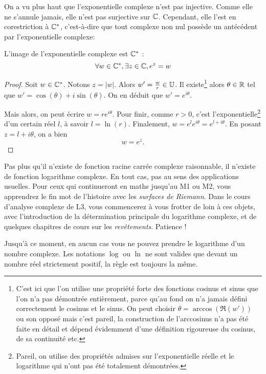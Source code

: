 On a vu plus haut que l'exponentielle complexe n'est pas injective. Comme elle ne s'annule jamais, elle n'est pas surjective sur $\mathbb{C}$. Cependant, elle l'est en corestriction à $\mathbb{C}^*$, c'est-à-dire que tout complexe non nul possède un antécédent par l'exponentielle complexe:

\begin{proposition}
L'image de l'exponentielle complexe est $\mathbb{C}^*$ :
\[ \forall w\in\mathbb{C}^*, \exists z\in\mathbb{C}, e^z=w\]
\end{proposition}
\begin{proof}
Soit $w\in\mathbb{C}^*$. Notons $z=|w|$. Alors $w'=\frac{w}{r}\in\mathbb{U}$. Il existe\footnote{C'est ici que l'on utilise une propriété forte des fonctions cosinus et sinus que l'on n'a pas démontrée entièrement, parce qu'au fond on n'a jamais défini correctement le cosinus et le sinus. On peut choisir $\theta = \arccos(\Re(w'))$ ou son opposé mais c'est pareil, la construction de l'arccosinus n'a pas été faite en détail et dépend évidemment d'une définition rigoureuse du cosinus, de sa continuité etc.} alors $\theta\in\mathbb{R}$ tel que $w'=\cos(\theta)+i\sin(\theta)$. On en déduit que $w'=e^{i\theta}$.

Mais alors, on peut écrire $w=re^{i\theta}$. Pour finir, comme $r>0$, c'est l'exponentielle\footnote{Pareil, on utilise des propriétés admises sur l'exponentielle réelle et le logarithme qui n'ont pas été totalement démontrées.} d'un certain réel $l$, à savoir $l = \ln(r)$. Finalement, $w=e^le^{i\theta} = e^{l+i\theta}$. En posant $z=l+i\theta$, on a bien
\[ w = e^z.\]
\end{proof}

\begin{mdframed}
Pas plus qu'il n'existe de fonction \og racine carrée complexe\fg{} raisonnable, il n'existe de fonction \og logarithme complexe\fg. En tout cas, pas au sens des applications usuelles. Pour ceux qui continueront en maths jusqu'au M1 ou M2, vous apprendrez le fin mot de l'histoire avec les \emph{surfaces de Riemann}. Dans le cours d'analyse complexe de L3, vous commencerez à vous frotter de loin à ces objets, avec l'introduction de la \og détermination principale du logarithme complexe\fg, et de quelques chapitres de cours sur les \emph{revêtements}. Patience !

Jusqu'à ce moment, en aucun cas vous ne pouvez prendre le \og logarithme\fg{} d'un nombre complexe. Les notations $\log$ ou $\ln$ ne sont valides que devant un nombre réel strictement positif, la règle est toujours la même.
\end{mdframed}

